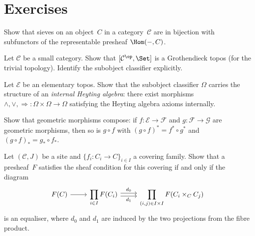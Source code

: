 

\section{Exercises}\label{sec:topos-exercises}

\begin{exercise}\label{ex:sieves-subfunctors}
Show that sieves on an object~$C$ in a category~$\mathcal{C}$ are in
bijection with subfunctors of the representable presheaf $\Hom(-,C)$.
\end{exercise}

\begin{exercise}\label{ex:presheaf-topos}
Let $\mathcal{C}$ be a small category.  Show that $[\mathcal{C}^{\op}, \Set]$
is a Grothendieck topos (for the trivial topology).
Identify the subobject classifier explicitly.
\end{exercise}

\begin{exercise}\label{ex:omega-internal-heyting}
Let $\mathcal{E}$ be an elementary topos.  Show that the subobject
classifier $\Omega$ carries the structure of an \emph{internal Heyting
algebra}: there exist morphisms
$\wedge, \vee, \Rightarrow\colon\Omega\times\Omega\to\Omega$
satisfying the Heyting algebra axioms internally.
\end{exercise}

\begin{exercise}\label{ex:geometric-morphism-compose}
Show that geometric morphisms compose: if
$f\colon\mathcal{E}\to\mathcal{F}$ and $g\colon\mathcal{F}\to\mathcal{G}$
are geometric morphisms, then so is $g\circ f$ with
$(g\circ f)^* = f^*\circ g^*$ and $(g\circ f)_* = g_*\circ f_*$.
\end{exercise}

\begin{exercise}\label{ex:sheaf-condition-equaliser}
Let $(\mathcal{C},J)$ be a site and $\{f_i\colon C_i\to C\}_{i\in I}$
a covering family.  Show that a presheaf~$F$ satisfies the sheaf condition
for this covering if and only if the diagram
\[
\begin{tikzcd}
F(C) \arrow[r] &
\displaystyle\prod_{i\in I} F(C_i)
  \arrow[r, shift left=0.5ex, "d_0"]
  \arrow[r, shift right=0.5ex, "d_1"'] &
\displaystyle\prod_{(i,j)\in I\times I} F(C_i\times_C C_j)
\end{tikzcd}
\]
is an equaliser, where $d_0$ and $d_1$ are induced by the two projections
from the fibre product.
\end{exercise}

